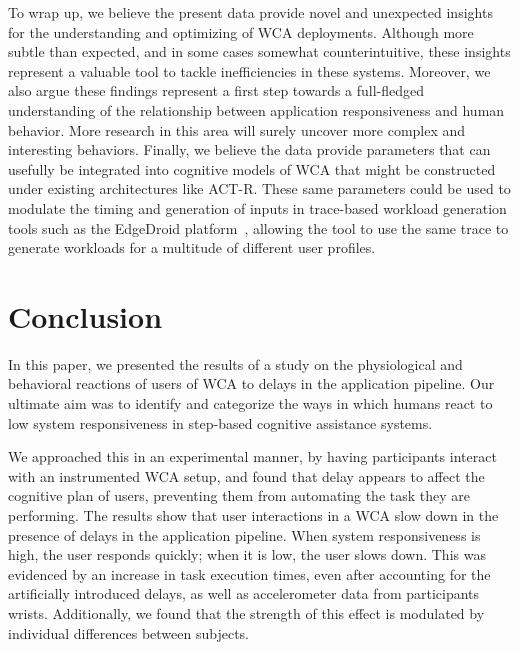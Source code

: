 To wrap up, we believe the present data provide novel and unexpected insights for the understanding and optimizing of WCA deployments.
Although more subtle than expected, and in some cases somewhat counterintuitive, these insights represent a valuable tool to tackle inefficiencies in these systems.
Moreover, we also argue these findings represent a first step towards a full-fledged understanding of the relationship between application responsiveness and human behavior.
More research in this area will surely uncover more complex and interesting behaviors.
Finally, we believe the data provide parameters that can usefully be integrated into cognitive models of WCA that might be constructed under existing architectures like ACT-R.
These same parameters could be used to modulate the timing and generation of inputs in trace-based workload generation tools such as the EdgeDroid platform~\cite{olguin:2018,olguin:2019}, allowing the tool to use the same trace to generate workloads for a multitude of different user profiles.

\section{Conclusion}\label{sec:conclusion}

In this paper, we presented the results of a study on the physiological and behavioral reactions of users of WCA to delays in the application pipeline.
Our ultimate aim was to identify and categorize the ways in which humans react to low system responsiveness in step-based cognitive assistance systems.

We approached this in an experimental manner, by having participants interact with an instrumented WCA setup, and found that delay appears to affect the cognitive plan of users, preventing them from automating the task they are performing.
The results show that user interactions in a WCA slow down in the presence of delays in the application pipeline.
When system responsiveness is high, the user responds quickly; when it is low, the user slows down.
This was evidenced by an increase in task execution times, even after accounting for the artificially introduced delays, as well as accelerometer data from participants wrists.
Additionally, we found that the strength of this effect is modulated by individual differences between subjects.

